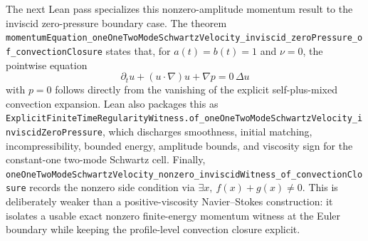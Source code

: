 \documentclass[11pt]{article}
\begin{document}
The next Lean pass specializes this nonzero-amplitude momentum result to the
inviscid zero-pressure boundary case.  The theorem
\texttt{momentumEquation\_oneOneTwoModeSchwartzVelocity\_inviscid\_zeroPressure\_of\_convectionClosure}
states that, for \(a(t)=b(t)=1\) and \(\nu=0\), the pointwise equation
\[
  \partial_t u + (u\cdot\nabla)u + \nabla p = 0\,\Delta u
\]
with \(p=0\) follows directly from the vanishing of the explicit
self-plus-mixed convection expansion.  Lean also packages this as
\texttt{ExplicitFiniteTimeRegularityWitness.of\_oneOneTwoModeSchwartzVelocity\_inviscidZeroPressure},
which discharges smoothness, initial matching, incompressibility, bounded
energy, amplitude bounds, and viscosity sign for the constant-one two-mode
Schwartz cell.  Finally,
\texttt{oneOneTwoModeSchwartzVelocity\_nonzero\_inviscidWitness\_of\_convectionClosure}
records the nonzero side condition via
\(\exists x,\ f(x)+g(x)\ne 0\).  This is deliberately weaker than a
positive-viscosity Navier--Stokes construction: it isolates a usable exact
nonzero finite-energy momentum witness at the Euler boundary while keeping the
profile-level convection closure explicit.
\end{document}
